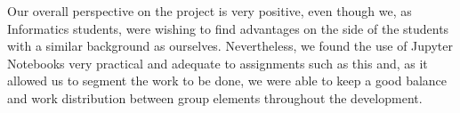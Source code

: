 \documentclass[conference]{IEEEtran}
\begin{document}
Our overall perspective on the project is very positive, even though we, as 
Informatics students, were wishing to find advantages on the side of the 
students with a similar background as ourselves.
Nevertheless, we found the use of Jupyter Notebooks very practical and adequate 
to assignments such as this and, as it allowed us to segment the work to be done,
we were able to keep a good balance and work distribution between group elements 
throughout the development.







\end{document}
